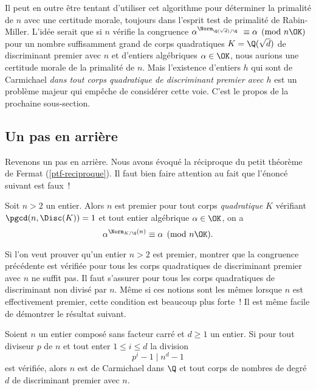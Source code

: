 Il peut en outre être tentant d'utiliser cet algorithme pour déterminer la primalité de $n$ avec une certitude morale, toujours dans l'esprit test de primalité de Rabin-Miller. L'idée serait que si $n$ vérifie la congruence $\alpha^{\Norm_{\Q(\sqrt{d})/\Q}} \equiv \alpha \pmod{n\OK}$ pour un nombre suffisamment grand de corps quadratiques $K = \Q(\sqrt{d})$ de discriminant premier avec $n$ et d'entiers algébriques $\alpha \in \OK$, nous aurions une certitude morale de la primalité de $n$. Mais l'existence d'entiers $h$ qui sont de Carmichael \emph{dans tout corps quadratique de discriminant premier avec $h$} est un problème majeur qui empêche de considérer cette voie. C'est le propos de la prochaine sous-section.

\subsection{Un pas en arrière}

Revenons un pas en arrière. Nous avons évoqué la réciproque du petit théorème de Fermat (\ref{ptf-reciproque}). Il faut bien faire attention au fait que l'énoncé suivant est faux~!

\begin{enoncefaux}
	Soit $n>2$ un entier. Alors $n$ est premier \ssi pour tout corps \emph{quadratique} $K$ vérifiant $\pgcd(n, \Disc(K)) = 1$ et tout entier algébrique $\alpha \in \OK$, on a $$\alpha^{\Norm_{K/\Q}(n)} \equiv \alpha \pmod{n\OK}.$$
\end{enoncefaux}

Si l'on veut prouver qu'un entier $n>2$ est premier, montrer que la congruence précédente est vérifiée pour tous les corps quadratiques de discriminant premier avec $n$ ne suffit pas. Il faut s'assurer pour tous les corps quadratiques de discriminant non divisé par $n$. Même si ces notions sont les mêmes lorsque $n$ est effectivement premier, cette condition est beaucoup plus forte~! Il est même facile de démontrer le résultat suivant.

\begin{theoreme}\label{theoreme-2.7}
	Soient $n$ un entier composé sans facteur carré et $d\geq 1$ un entier. Si pour tout diviseur $p$ de $n$ et tout enter $1\leq i \leq d$ la division $$p^i - 1\mid n^d - 1$$ est vérifiée, alors $n$ est de Carmichael dans $\Q$ et tout corps de nombres de degré $d$ de discriminant premier avec $n$.
\end{theoreme}

